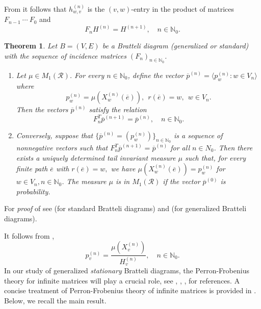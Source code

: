 \documentclass[11pt,reqno]{amsart}
\theoremstyle{definition}
\theoremstyle{remark}
\theoremstyle{plain}
\newtheorem{thm}[definition]{Theorem}
\def\ol{\overline}
\def\ov{\overline}
\newcommand{\N}{\mathbb N}
\newcommand{\be}{\begin{equation}}
\newcommand{\ee}{\end{equation}}
\newcommand{\mc}{\mathcal}
\numberwithin{equation}{section}
\begin{document}
From  it follows that $h_{w,v}^{(n)}$ is the 
$(v,w)$-entry in the product of matrices $F_{n-1} \ \cdots \ F_0$  and 
 \be\label{eq2: FH=H}
F_n H^{(n)} = H^{(n+1)}, \quad n \in \N_0.
 \ee
 
\begin{thm}\label{BKMS_measures=invlimits}
 Let $B = (V,E)$ be a Bratteli diagram (generalized or standard) 
 with the sequence of incidence matrices $(F_n)_{n  \in \N_0}$. 
\begin{enumerate}

\item Let $\mu \in  M_1(\mc R)$. For every 
$n\in \N_0$, define the vector $\ol p^{(n)} = \langle p^{(n)}_w : w \in V_n \rangle$ where 
\begin{equation}\label{eq:def_p_n}
    p^{(n)}_w= \mu(X_w^{(n)}(\ov e)),\ \ r(\ol e) = w, \ \ w\in V_n. 
\end{equation} 
Then the vectors   $\ol p^{(n)}$ satisfy the relation 
\begin{equation}\label{eq:formula_p_n}
F_n^{T} \ol p^{(n+1)} =\ol p^{(n)}, \quad n \in \N_0.
\end{equation}

\item Conversely, suppose that $\{\ol p^{(n)}= (p_w^{(n)}) 
\}_{n \in \N_0}$ is a sequence of nonnegative vectors such 
that $F_n^{T}\ol p^{(n+1)} =\ol p^{(n)}$ for all $n \in 
N_0$. Then there exists a uniquely determined tail 
invariant measure $\mu$ such that, for every finite path $\ol e$ with $r(\ol e) = w,$ we have $\mu(X_w^{(n)}(\ov e))= p_w^{(n)}$ for $w\in V_n, n \in \mathbb N_0$. The measure $\mu$ is in $M_1(\mc R)$ if the vector $\ol p^{(0)}$ is probability. 
\end{enumerate}
\end{thm}
For \textit{proof} of  see 
\cite[Theorem 2.9.]{BezuglyiKwiatkowskiMedynetsSolomyak2010} (for 
standard Bratteli diagrams) and 
\cite[Theorem 2.3.2]{BezuglyiJorgensen2022} (for generalized Bratteli 
diagrams). 

It follows from ,
\begin{equation}\label{eq: Measure_Xv_H_P}
    p_v^{(n)} = \dfrac{\mu(X_v^{(n)})}{H_v^{(n)}}, \quad n \in \N_0.
\end{equation}
In our study of generalized \textit{stationary} Bratteli diagrams, the Perron-Frobenius theory for infinite matrices will play a crucial role, see \cite[Chapter 7]{Kitchens1998}, \cite{Seneta2006}, 
\cite{VereJones_1967}, \cite{VereJones_1968} for references. A concise treatment of Perron-Frobenius theory of infinite matrices is provided in \cite[Appendix A.]{BezuglyiJorgensenKarpelSanadhya2025}. Below, we recall the main result.
\end{document}
